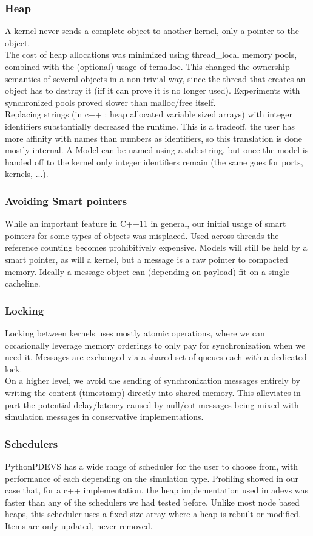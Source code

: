 \subsubsection{Heap}
A kernel never sends a complete object to another kernel, only a pointer to the object.\\
The cost of heap allocations was minimized using thread\_local memory pools, combined with the (optional) usage of tcmalloc\cite{tcmalloc}.
This changed the ownership semantics of several objects in a non-trivial way, since the thread that creates an object has to destroy it (iff it can prove it is no longer used). Experiments with synchronized pools proved slower than malloc/free itself. \\
Replacing strings (in c++ : heap allocated variable sized arrays) with integer identifiers substantially decreased the runtime. This is a tradeoff, the user has more affinity with names than numbers as identifiers, so this translation is done mostly internal. A Model can be named using a std::string, but once the model is handed off to the kernel only integer identifiers remain (the same goes for ports, kernels, ...).
\\
\subsubsection{Avoiding Smart pointers}
While an important feature in C++11 in general, our initial usage of smart pointers for some types of objects was misplaced. Used across threads the reference counting becomes prohibitively expensive. Models will still be held by a smart pointer, as will a kernel, but a message is a raw pointer to compacted memory. Ideally a message object can (depending on payload) fit on a single cacheline.\\
\subsubsection{Locking}
Locking between kernels uses mostly atomic operations, where we can occasionally leverage memory orderings to only pay for synchronization when we need it. Messages are exchanged via a shared set of queues each with a dedicated lock.\\
On a higher level, we avoid the sending of synchronization messages entirely by writing the content (timestamp) directly into shared memory. This alleviates in part the potential delay/latency caused by null/eot messages being mixed with simulation messages in conservative implementations. 
\subsubsection{Schedulers}
PythonPDEVS has a wide range of scheduler for the user to choose from, with performance of each depending on the simulation type. Profiling showed in our case that, for a c++ implementation, the heap implementation used in adevs was faster than any of the schedulers we had tested before. Unlike most node based heaps, this scheduler uses a fixed size array where a heap is rebuilt or modified. Items are only updated, never removed.
